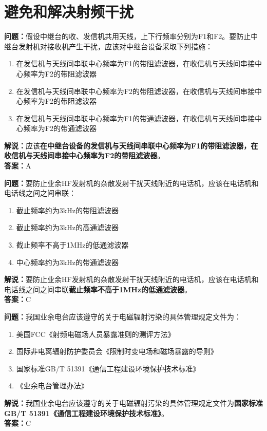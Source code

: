\documentclass{ctexbook}
\begin{document}
\chapter{避免和解决射频干扰}



\noindent\textbf{问题：}假设中继台的收、发信机共用天线，上下行频率分别为F1和F2。要防止中继台发射机对接收机产生干扰，应该对中继台设备采取下列措施：
\begin{enumerate}[label=\Alph*), leftmargin=3em]
	\item 在发信机与天线间串联中心频率为F1的带阻滤波器，在收信机与天线间串接中心频率为F2的带阻滤波器
	\item 在发信机与天线间串联中心频率为F2的带阻滤波器，在收信机与天线间串接中心频率为F2的带阻滤波器
	\item 在发信机与天线间串联中心频率为F1的带通滤波器，在收信机与天线间串接中心频率为F2的带通滤波器
\end{enumerate}
\noindent\textbf{解说：}应该\textbf{在中继台设备的发信机与天线间串联中心频率为F1的带阻滤波器，在收信机与天线间串接中心频率为F2的带阻滤波器}。\\\noindent\textbf{答案：}A

\bigskip


\noindent\textbf{问题：}要防止业余HF发射机的杂散发射干扰天线附近的电话机，应该在电话机和电话线之间之间串联：
\begin{enumerate}[label=\Alph*), leftmargin=3em]	
	\item 截止频率约为3kHz的带阻滤波器
	\item 截止频率约为3kHz的高通滤波器
	\item 截止频率不高于1MHz的低通滤波器
	\item 中心频率约为3kHz的带通滤波器
\end{enumerate}
\noindent\textbf{解说：}要防止业余HF发射机的杂散发射干扰天线附近的电话机，应该在电话机和电话线之间之间串联\textbf{截止频率不高于1MHz的低通滤波器}。\\\noindent
\textbf{答案：}C

\bigskip


\noindent\textbf{问题：}我国业余电台应该遵守的关于电磁辐射污染的具体管理规定文件为： 
\begin{enumerate}[label=\Alph*), leftmargin=3em]
	\item 美国FCC《射频电磁场人员暴露准则的测评方法》
	\item 国际非电离辐射防护委员会《限制时变电场和磁场暴露的导则》
	\item 国家标准GB/T 51391《通信工程建设环境保护技术标准》
	\item 《业余电台管理办法》
\end{enumerate}
\noindent\textbf{解说：}我国业余电台应该遵守的关于电磁辐射污染的具体管理规定文件为\textbf{国家标准GB/T 51391《通信工程建设环境保护技术标准》}。\\\textbf{答案：}C
\end{document}
